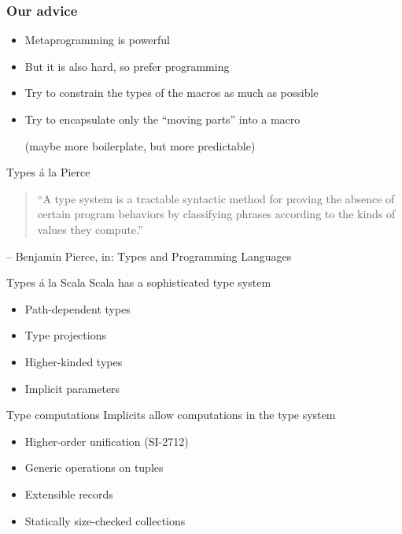 \documentclass{beamer}
\begin{document}
\begin{frame}[fragile]
\frametitle{Our advice}
  \begin{itemize}
    \item Metaprogramming is powerful
    \item But it is also hard, so prefer programming
    \item Try to constrain the types of the macros as much as possible
    \item Try to encapsulate only the ``moving parts'' into a macro

      (maybe more boilerplate, but more predictable)
  \end{itemize}
\end{frame}


\begin{frame}
\vskip40pt
\begin{center}
\end{center}
\end{frame}

\begin{frame}{Types \'a la Pierce}
  \begin{quote}
    ``A type system is a tractable syntactic method for \alert<2>{proving the absence of certain program behaviors} by classifying phrases according to the kinds of values they compute.''
  \end{quote}
  \hfill -- Benjamin Pierce, in: Types and Programming Languages
\end{frame}

\begin{frame}{Types \'a la Scala}
  Scala has a sophisticated type system
  \begin{itemize}
    \item Path-dependent types
    \item Type projections
    \item Higher-kinded types
    \item Implicit parameters
  \end{itemize}
\end{frame}

\begin{frame}{Type computations}
  Implicits allow computations in the type system

  \begin{itemize}
    \item Higher-order unification (SI-2712)
    \item Generic operations on tuples
    \item Extensible records
    \item Statically size-checked collections
  \end{itemize}
\end{frame}
\end{document}

